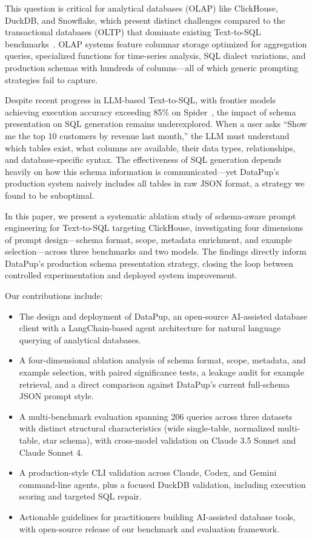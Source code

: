 \documentclass[sigconf, nonacm]{acmart}
\begin{document}
This question is critical for analytical databases (OLAP) like ClickHouse, DuckDB, and Snowflake, which present distinct challenges compared to the transactional databases (OLTP) that dominate existing Text-to-SQL benchmarks~\cite{yu2018spider}. OLAP systems feature columnar storage optimized for aggregation queries, specialized functions for time-series analysis, SQL dialect variations, and production schemas with hundreds of columns---all of which generic prompting strategies fail to capture.

Despite recent progress in LLM-based Text-to-SQL, with frontier models achieving execution accuracy exceeding 85\% on Spider~\cite{yu2018spider}, the impact of schema presentation on SQL generation remains underexplored. When a user asks ``Show me the top 10 customers by revenue last month,'' the LLM must understand which tables exist, what columns are available, their data types, relationships, and database-specific syntax. The effectiveness of SQL generation depends heavily on how this schema information is communicated---yet DataPup's production system naively includes all tables in raw JSON format, a strategy we found to be suboptimal.

In this paper, we present a systematic ablation study of schema-aware prompt engineering for Text-to-SQL targeting ClickHouse, investigating four dimensions of prompt design---schema format, scope, metadata enrichment, and example selection---across three benchmarks and two models. The findings directly inform DataPup's production schema presentation strategy, closing the loop between controlled experimentation and deployed system improvement.

Our contributions include:
\begin{itemize}
    \item The design and deployment of DataPup, an open-source AI-assisted database client with a LangChain-based agent architecture for natural language querying of analytical databases.
    \item A four-dimensional ablation analysis of schema format, scope, metadata, and example selection, with paired significance tests, a leakage audit for example retrieval, and a direct comparison against DataPup's current full-schema JSON prompt style.
    \item A multi-benchmark evaluation spanning 206 queries across three datasets with distinct structural characteristics (wide single-table, normalized multi-table, star schema), with cross-model validation on Claude 3.5 Sonnet and Claude Sonnet 4.
    \item A production-style CLI validation across Claude, Codex, and Gemini command-line agents, plus a focused DuckDB validation, including execution scoring and targeted SQL repair.
    \item Actionable guidelines for practitioners building AI-assisted database tools, with open-source release of our benchmark and evaluation framework.
\end{itemize}
\end{document}
